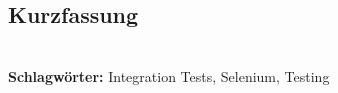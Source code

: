 
\subsection*{Kurzfassung}



%
\mbox{}\\[0.5\baselineskip]\noindent
\textbf{Schlagwörter:} 
Integration Tests, Selenium, Testing
